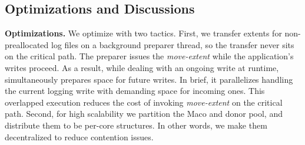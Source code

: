 \subsection{Optimizations and Discussions}\label{sec:design:discussion}
{\bf Optimizations.}
We   optimize \odes with two tactics.
First,
we transfer extents for non-preallocated log files on a background preparer thread,
so the transfer never sits on the critical path.
The preparer issues the {\it move-extent} while the application's writes proceed.
As a result,
while dealing with an ongoing   write at runtime,
\odes  simultaneously prepares space for future writes.
In brief, it parallelizes handling
the current logging write with demanding space for   incoming ones.
This overlapped execution    reduces the cost of invoking   {\it move-extent}
on the critical path.
Second, for high scalability
we partition  the  Maco and donor pool, and distribute them to be per-core  structures. 
In other words, we make them decentralized to reduce contention issues.

